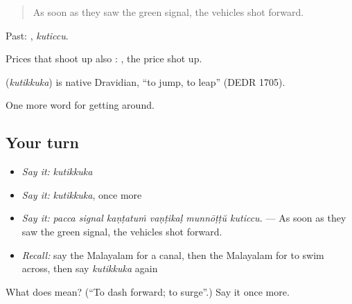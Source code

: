 \begin{quote}
As soon as they saw the green signal, the vehicles shot forward.
\end{quote}

Past: , \emph{kuticcu}.

Prices that shoot up also :  , the price shot up.

\begin{cousinweb}
\textbf{} (\emph{kutikkuka}) is native Dravidian, \textquotedblleft{}to jump, to leap\textquotedblright{} (DEDR 1705).
\end{cousinweb}

\begin{grammarlens}[title={What you've built}]
One more word for getting around.
\end{grammarlens}

\subsection*{Your turn}
\begin{itemize}
\raggedright
  \item \emph{Say it:} \emph{kutikkuka}
  \item \emph{Say it:} \emph{kutikkuka}, once more
  \item \emph{Say it:} \emph{pacca signal kaṇṭatuṁ vaṇṭikaḷ munnōṭṭŭ kuticcu.} — As soon as they saw the green signal, the vehicles shot forward.
  \item \emph{Recall:} say the Malayalam for a canal, then the Malayalam for to swim across, then say \emph{kutikkuka} again
\end{itemize}

\begin{tcolorbox}[breakable,colback=teal!4,colframe=teal!35!black,title={Before you move on}]
What does  mean? (\textquotedblleft{}To dash forward; to surge\textquotedblright{}.) Say it once more.
\end{tcolorbox}
